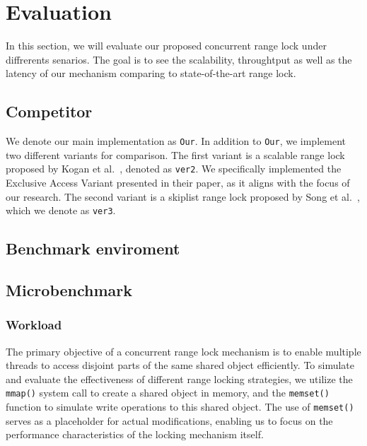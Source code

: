 \chapter{Evaluation}\label{chapter:evaluation}

In this section, we will evaluate our proposed concurrent range lock under diffrerents senarios. The goal is to see the scalability, throughtput as well as the latency of our mechanism comparing to state-of-the-art range lock.

\section{Competitor}

We denote our main implementation as \texttt{Our}. In addition to \texttt{Our}, we implement two different variants for comparison. The first variant is a scalable range lock proposed by Kogan et al.~\parencite{kogan2020scalable}, denoted as \texttt{ver2}. We specifically implemented the Exclusive Access Variant presented in their paper, as it aligns with the focus of our research. The second variant is a skiplist range lock proposed by Song et al.~\parencite{song2013parallelizing}, which we denote as \texttt{ver3}.

\section{Benchmark enviroment}

\section{Microbenchmark}\label{sec:microbenchmark}

\subsection{Workload}\label{subsec:workload}
The primary objective of a concurrent range lock mechanism is to enable multiple threads to access disjoint parts of the same shared object efficiently. To simulate and evaluate the effectiveness of different range locking strategies, we utilize the \texttt{mmap()} system call to create a shared object in memory, and the \texttt{memset()} function to simulate write operations to this shared object. The use of \texttt{memset()} serves as a placeholder for actual modifications, enabling us to focus on the performance characteristics of the locking mechanism itself.

